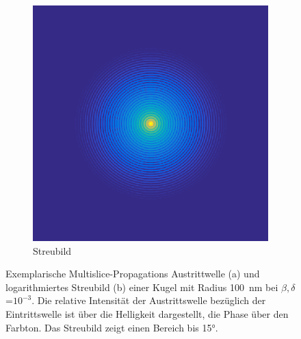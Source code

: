 \begin{figure}
\begin{subfigure}[b]{0.4\textwidth}
		\includegraphics[width=\textwidth]{images/fig_sim_scatter_multislice-r100-bd1e-3.png}
		\caption{Streubild}
		\label{fig:scatter}
	\end{subfigure}
	\caption[Austrittswelle und Streubild einer Kugel]{Exemplarische Multislice-Propagations Austrittwelle (a) und logarithmiertes Streubild (b) einer Kugel mit Radius \SI{100}{nm} bei $\beta,\delta$=$10^{-3}$. Die relative Intensität der Austrittswelle bezüglich der Eintrittswelle ist über die Helligkeit dargestellt, die Phase über den Farbton. Das Streubild zeigt einen Bereich bis 15°.}
	\label{fig:exitscatter}
\end{figure}%


